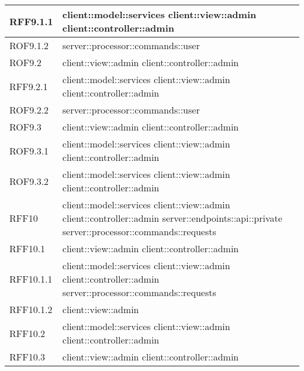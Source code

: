 \begin{center}
\begin{longtable}{| p{4cm} | p{8cm} |}
\hline
RFF9.1.1 & client::model::services \newline client::view::admin \newline client::controller::admin \\
\hline
ROF9.1.2 & server::processor::commands::user \\
\hline
ROF9.2 & client::view::admin \newline client::controller::admin \\
\hline
RFF9.2.1 & client::model::services \newline client::view::admin \newline client::controller::admin \\
\hline
ROF9.2.2 & server::processor::commands::user \\
\hline
ROF9.3 & client::view::admin \newline client::controller::admin \\
\hline
ROF9.3.1 & client::model::services \newline client::view::admin \newline client::controller::admin \\
\hline
ROF9.3.2 & client::model::services \newline client::view::admin \newline client::controller::admin \\
\hline
RFF10 & client::model::services \newline client::view::admin \newline client::controller::admin \newline server::endpoints::api::private \newline server::processor::commands::requests \\
\hline
RFF10.1 & client::view::admin \newline client::controller::admin \\
\hline
RFF10.1.1 & client::model::services \newline client::view::admin \newline client::controller::admin \newline server::processor::commands::requests \\
\hline
RFF10.1.2 & client::view::admin \\
\hline
RFF10.2 & client::model::services \newline client::view::admin \newline client::controller::admin \\
\hline
RFF10.3 & client::view::admin \newline client::controller::admin \\

\end{longtable}
\end{center}

